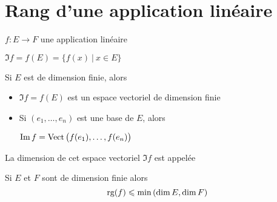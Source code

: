 \section{Rang d'une application linéaire}

\begin{frame}


$f : E \to F$ une application linéaire

$\Im f = f(E) =  \big\{ f(x) \ | \ x \in E \big\}$

\pause

\begin{proposition}
Si $E$ est de dimension finie, alors 
\begin{itemize}
  \item $\Im f = f(E)$ est un espace vectoriel de dimension finie
  \pause
  \item Si $(e_1,\ldots,e_n)$ est une base de $E$, alors
  
  \centerline{$\mathop{\text{Im}}\nolimits f = \mathop{\text{Vect}}\nolimits \big( f(e_1),\ldots,f(e_n) \big)$}
  
  \pause
\end{itemize}

\medskip

La dimension de cet espace vectoriel $\Im f$ est appelée 
\vspace*{-1ex}
\end{proposition}

\pause
\begin{proposition}
Si $E$ et $F$ sont de dimension finie 
alors 
\vspace*{-2ex}
$$\mathop{\text{rg}}\nolimits(f) \leqslant \min \left ( \dim E, \dim F \right)$$
\end{proposition}
\end{frame}


